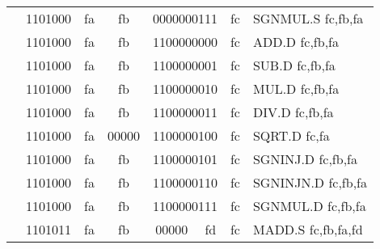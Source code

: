 \begin{table}[p]
\begin{small}
\begin{center}
\begin{tabular}{rcccccccccl}
&
\multicolumn{2}{|c|}{1101000} &
\multicolumn{1}{c|}{fa} &
\multicolumn{1}{c|}{fb} &
\multicolumn{4}{c|}{0000000111} &
\multicolumn{1}{c|}{fc} & SGNMUL.S fc,fb,fa \\
\cline{2-10}
  

&
\multicolumn{2}{|c|}{1101000} &
\multicolumn{1}{c|}{fa} &
\multicolumn{1}{c|}{fb} &
\multicolumn{4}{c|}{1100000000} &
\multicolumn{1}{c|}{fc} & ADD.D fc,fb,fa \\
\cline{2-10}
  

&
\multicolumn{2}{|c|}{1101000} &
\multicolumn{1}{c|}{fa} &
\multicolumn{1}{c|}{fb} &
\multicolumn{4}{c|}{1100000001} &
\multicolumn{1}{c|}{fc} & SUB.D fc,fb,fa \\
\cline{2-10}
  

&
\multicolumn{2}{|c|}{1101000} &
\multicolumn{1}{c|}{fa} &
\multicolumn{1}{c|}{fb} &
\multicolumn{4}{c|}{1100000010} &
\multicolumn{1}{c|}{fc} & MUL.D fc,fb,fa \\
\cline{2-10}
  

&
\multicolumn{2}{|c|}{1101000} &
\multicolumn{1}{c|}{fa} &
\multicolumn{1}{c|}{fb} &
\multicolumn{4}{c|}{1100000011} &
\multicolumn{1}{c|}{fc} & DIV.D fc,fb,fa \\
\cline{2-10}
  

&
\multicolumn{2}{|c|}{1101000} &
\multicolumn{1}{c|}{fa} &
\multicolumn{1}{c|}{00000} &
\multicolumn{4}{c|}{1100000100} &
\multicolumn{1}{c|}{fc} & SQRT.D fc,fa \\
\cline{2-10}
  

&
\multicolumn{2}{|c|}{1101000} &
\multicolumn{1}{c|}{fa} &
\multicolumn{1}{c|}{fb} &
\multicolumn{4}{c|}{1100000101} &
\multicolumn{1}{c|}{fc} & SGNINJ.D fc,fb,fa \\
\cline{2-10}
  

&
\multicolumn{2}{|c|}{1101000} &
\multicolumn{1}{c|}{fa} &
\multicolumn{1}{c|}{fb} &
\multicolumn{4}{c|}{1100000110} &
\multicolumn{1}{c|}{fc} & SGNINJN.D fc,fb,fa \\
\cline{2-10}
  

&
\multicolumn{2}{|c|}{1101000} &
\multicolumn{1}{c|}{fa} &
\multicolumn{1}{c|}{fb} &
\multicolumn{4}{c|}{1100000111} &
\multicolumn{1}{c|}{fc} & SGNMUL.D fc,fb,fa \\
\cline{2-10}
  

&
\multicolumn{2}{|c|}{1101011} &
\multicolumn{1}{c|}{fa} &
\multicolumn{1}{c|}{fb} &
\multicolumn{2}{c|}{00000} &
\multicolumn{2}{c|}{fd} &
\multicolumn{1}{c|}{fc} & MADD.S fc,fb,fa,fd \\
\cline{2-10}
  


\end{tabular}
\end{center}
\end{small}
\end{table}
